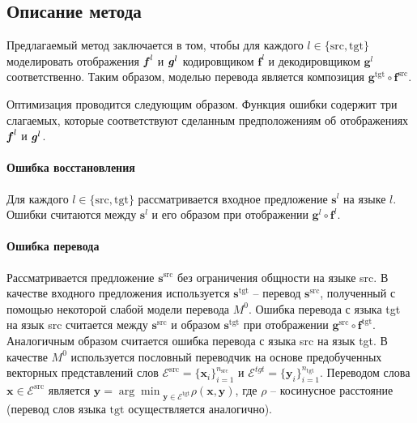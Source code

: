 \documentclass[12pt,twoside]{article}
\begin{document}
\subsection{Описание метода}
   Предлагаемый метод заключается в том, чтобы для каждого $l \in \{\text{src}, \text{tgt}\}$  моделировать отображения $\textbf{\textit{f}}^{l}$ и $\textbf{\textit{g}}^{l}$ кодировщиком $\textbf{f}^{l}$ и декодировщиком $\textbf{g}^{l}$ соответственно. Таким образом, моделью перевода является композиция $\textbf{g}^{\text{tgt}} \circ \textbf{f}^{\text{src}}$.

   Оптимизация проводится следующим образом. Функция ошибки содержит три слагаемых, которые соответствуют сделанным предположениям об отображениях $\textbf{\textit{f}}^{l}$ и $\textbf{\textit{g}}^{l}$.
   \paragraph{Ошибка восстановления} Для каждого $l \in \{\text{src}, \text{tgt}\}$ рассматривается входное предложение $\mathbf{s}^{l}$ на языке $l$. Ошибки считаются между $\mathbf{s}^{l}$ и его образом при отображении $\textbf{g}^{l} \circ \textbf{f}^{l}$.

   \paragraph{Ошибка перевода} Рассматривается предложение $\mathbf{s}^{\text{src}}$ без ограничения общности на языке src. В качестве входного предложения используется $\mathbf{s}^{\text{tgt}}$ -- перевод $\mathbf{s}^{\text{src}}$, полученный с помощью некоторой слабой модели перевода $M^0$. Ошибка перевода с языка tgt на язык src считается между $\mathbf{s}^{\text{src}}$ и образом $\mathbf{s}^{\text{tgt}}$ при отображении $\textbf{g}^{\text{src}} \circ \textbf{f}^{\text{tgt}}$. Аналогичным образом считается ошибка перевода с языка src на язык tgt. В качестве $M^0$ используется пословный переводчик на основе предобученных векторных представлений слов $\mathcal{E}^{\text{src}} = \{\textbf{x}_i\}_{i=1}^{n_{\text{src}}}$ и $\mathcal{E}^{tgt} = \{\textbf{y}_i\}_{i=1}^{n_{\text{tgt}}}$. Переводом слова $\textbf{x} \in \mathcal{E}^{\text{src}}$ является $\textbf{y} = {\arg\min}_{\textbf{y} \in  \mathcal{E}^{\text{tgt}}} \rho(\textbf{x}, \textbf{y})$, где $\rho$ -- косинусное расстояние (перевод слов языка $\text{tgt}$ осуществляется аналогично).
\end{document}
